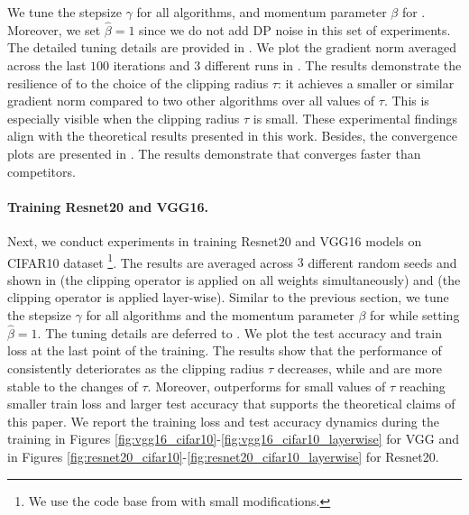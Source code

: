 \documentclass[a4paper,11pt]{article}
\begin{document}
We tune the stepsize $\gamma$ for all algorithms, and momentum parameter $\beta$ for . Moreover, we set $\hat{\beta}=1$ since we do not add DP noise in this set of experiments. The detailed tuning details are provided in . We plot the gradient norm averaged across the last $100$ iterations and  $3$ different runs in . The results demonstrate the resilience of  to the choice of the clipping radius $\tau$: it achieves a smaller or similar gradient norm compared to two other algorithms over all values of $\tau.$ This is especially visible when the clipping radius $\tau$ is small. These experimental findings align with the theoretical results presented in this work. Besides, the convergence plots are presented in . The results demonstrate that  converges faster than competitors. 






\paragraph{Training Resnet20 and VGG16.} Next, we conduct experiments in training Resnet20 \citep{he2016deep} and VGG16 \citep{simonyan2014very} models on CIFAR10 dataset \citep{krizhevsky2014cifar10}\footnote{We use the code base from \citep{horvath2020better} with small modifications.}. The results are averaged across $3$ different random seeds and shown in  (the clipping operator is applied on all weights simultaneously) and  (the clipping operator is applied layer-wise). Similar to the previous section, we tune the stepsize $\gamma$ for all algorithms and the momentum parameter $\beta$ for  while setting $\hat{\beta}=1.$ The tuning details are deferred to . We plot the test accuracy and train loss at the last point of the training. The results show that the performance of  consistently deteriorates as the clipping radius $\tau$ decreases, while  and  are more stable to the changes of $\tau.$ Moreover,  outperforms  for small values of $\tau$ reaching smaller train loss and larger test accuracy that supports the theoretical claims of this paper. We report the training loss and test accuracy dynamics during the training in Figures \ref{fig:vgg16_cifar10}-\ref{fig:vgg16_cifar10_layerwise} for VGG and in Figures \ref{fig:resnet20_cifar10}-\ref{fig:resnet20_cifar10_layerwise} for Resnet20.
\end{document}
